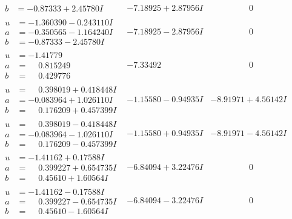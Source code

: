 \documentclass[1p]{elsarticle_modified}
\theoremstyle{definition}
\begin{document}
$$\begin{array}{c|c|c}
\begin{aligned}
b &= -0.87333 + 2.45780 I\end{aligned}
 & -7.18925 + 2.87956 I & \phantom{-0.000000 } 0 \\ \hline\begin{aligned}
u &= -1.360390 - 0.243110 I \\
a &= -0.350565 - 1.164240 I \\
b &= -0.87333 - 2.45780 I\end{aligned}
 & -7.18925 - 2.87956 I & \phantom{-0.000000 } 0 \\ \hline\begin{aligned}
u &= -1.41779\phantom{ +0.000000I} \\
a &= \phantom{-}0.815249\phantom{ +0.000000I} \\
b &= \phantom{-}0.429776\phantom{ +0.000000I}\end{aligned}
 & -7.33492\phantom{ +0.000000I} & \phantom{-0.000000 } 0 \\ \hline\begin{aligned}
u &= \phantom{-}0.398019 + 0.418448 I \\
a &= -0.083964 + 1.026110 I \\
b &= \phantom{-}0.176209 + 0.457399 I\end{aligned}
 & -1.15580 - 0.94935 I & -8.91971 + 4.56142 I \\ \hline\begin{aligned}
u &= \phantom{-}0.398019 - 0.418448 I \\
a &= -0.083964 - 1.026110 I \\
b &= \phantom{-}0.176209 - 0.457399 I\end{aligned}
 & -1.15580 + 0.94935 I & -8.91971 - 4.56142 I \\ \hline\begin{aligned}
u &= -1.41162 + 0.17588 I \\
a &= \phantom{-}0.399227 + 0.654735 I \\
b &= \phantom{-}0.45610 + 1.60564 I\end{aligned}
 & -6.84094 + 3.22476 I & \phantom{-0.000000 } 0 \\ \hline\begin{aligned}
u &= -1.41162 - 0.17588 I \\
a &= \phantom{-}0.399227 - 0.654735 I \\
b &= \phantom{-}0.45610 - 1.60564 I\end{aligned}
 & -6.84094 - 3.22476 I & \phantom{-0.000000 } 0 \\ \hline\begin{aligned}

\end{aligned}
\end{array}$$
\end{document}
